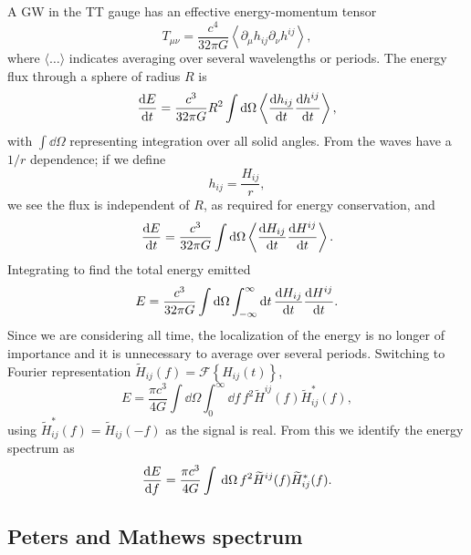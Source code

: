 A GW in the TT gauge has an effective energy-momentum tensor \citep[section 35.15]{Misner1973}
\begin{equation}
T_{\mu\nu} = \frac{c^4}{32\pi G}\left\langle\partial_\mu h_{ij} \partial_\nu h^{ij}\right\rangle,
\end{equation}
where $\langle\ldots\rangle$ indicates averaging over several wavelengths or periods. The energy flux through a sphere of radius $R$ is
\begin{equation}
\frac{\mathrm{d} {E}}{\mathrm{d} {t}} = \frac{c^3}{32\pi G} R^2 \int{\ensuremath{\mathrm{d}}\Omega}\left\langle\frac{\mathrm{d} {h_{ij}}}{\mathrm{d} {t}}\frac{\mathrm{d} {h^{ij}}}{\mathrm{d} {t}}\right\rangle,
\end{equation}
with $\int{\dd\Omega}$ representing integration over all solid angles. From  the waves have a $1/{r}$ dependence; if we define
\begin{equation}
h_{ij} = \frac{H_{ij}}{r},
\end{equation}
we see the flux is independent of $R$, as required for energy conservation, and
\begin{equation}
\frac{\mathrm{d} {E}}{\mathrm{d} {t}} = \frac{c^3}{32\pi G} \int{\ensuremath{\mathrm{d}}\Omega}\left\langle\frac{\mathrm{d} {H_{ij}}}{\mathrm{d} {t}}\frac{\mathrm{d} {H^{ij}}}{\mathrm{d} {t}}\right\rangle.
\end{equation}
Integrating to find the total energy emitted
\begin{equation}
E = \frac{c^3}{32\pi G} \int{\ensuremath{\mathrm{d}}\Omega}\int_{-\infty}^{\infty}{\mathrm{d} t} \, \frac{\mathrm{d} {H_{ij}}}{\mathrm{d} {t}}\frac{\mathrm{d} {H^{ij}}}{\mathrm{d} {t}}.
\label{eq:integrate_E}
\end{equation}
Since we are considering all time, the localization of the energy is no longer of importance and it is unnecessary to average over several periods. Switching to Fourier representation $\widetilde{H}_{ij}(f) = \mathscr{F}\left\{H_{ij}(t)\right\}$,
\begin{equation}
E = \frac{\pi c^3}{4 G} \int{\dd\Omega}\int_{0}^{\infty}{\dd f} \, f^2 \widetilde{H}^{ij}(f)\widetilde{H}_{ij}^*(f),
\label{eq:total_E}
\end{equation}
using $\widetilde{H}_{ij}^*(f) = \widetilde{H}_{ij}(-f)$ as the signal is real. From this we identify the energy spectrum as
\begin{align}
\frac{\mathrm{d} {E}}{\mathrm{d} {f}} = \frac{\pi c^3}{4 G} \int_{}^{}{}\,\mathrm{d}{\Omega} \, f^2 \widetilde{H}^{ij}(f)\widetilde{H}_{ij}^*(f).
\label{eq:NK_dEdf}
\end{align}

\subsection{Peters and Mathews spectrum}\label{sec:P-M}

